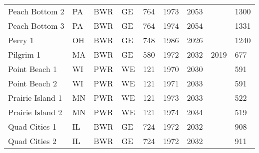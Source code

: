 \begin{table}[H]
\begin{tabular}{l l l l l l l l l}
    Peach Bottom 2      & PA & BWR & GE   & 764 & 1973 & 2053 &      & 1300\\
    Peach Bottom 3      & PA & BWR & GE   & 764 & 1974 & 2054 &      & 1331\\
    Perry 1             & OH & BWR & GE   & 748 & 1986 & 2026 &      & 1240\\
    Pilgrim 1           & MA & BWR & GE   & 580 & 1972 & 2032 & 2019 & 677 \\
    Point Beach 1       & WI & PWR & WE   & 121 & 1970 & 2030 &      & 591 \\
    Point Beach 2       & WI & PWR & WE   & 121 & 1971 & 2033 &      & 591 \\
    Prairie Island 1    & MN & PWR & WE   & 121 & 1973 & 2033 &      & 522 \\
    Prairie Island 2    & MN & PWR & WE   & 121 & 1974 & 2034 &      & 519 \\
    Quad Cities 1       & IL & BWR & GE   & 724 & 1972 & 2032 &      & 908 \\
    Quad Cities 2       & IL & BWR & GE   & 724 & 1972 & 2032 &      & 911 \\
    \hline
    \end{tabular}
\end{table}

